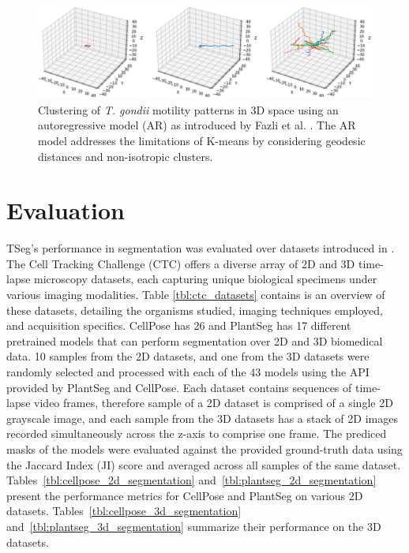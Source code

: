 \documentclass[./dissertation.tex]{subfiles}
\begin{document}
\begin{figure}[h]
    \centering\includegraphics[width=.9\textwidth]{figures/tseg/clusters plot.png}
    \caption{Clustering of \textit{\textit{T. gondii}} motility patterns in 3D space using an autoregressive model (AR) as introduced by Fazli et al. \cite{fazli2019lightweight}. The AR model addresses the limitations of K-means by considering geodesic distances and non-isotropic clusters.}
    \label{fig:clustering}
\end{figure}



\section{Evaluation}
TSeg's performance in segmentation was evaluated over datasets introduced in \cite{mavska2023cell}. The Cell Tracking Challenge (CTC) offers a diverse array of 2D and 3D time-lapse microscopy datasets, each capturing unique biological specimens under various imaging modalities. Table \ref{tbl:ctc_datasets} contains is an overview of these datasets, detailing the organisms studied, imaging techniques employed, and acquisition specifics. CellPose has 26 and PlantSeg has 17 different pretrained models that can perform segmentation over 2D and 3D biomedical data. 10 samples from the 2D datasets, and one from the 3D datasets were randomly selected and processed with each of the 43 models using the API provided by PlantSeg and CellPose. Each dataset contains sequences of time-lapse video frames, therefore sample of a 2D dataset is comprised of a single 2D grayscale image, and each sample from the 3D datasets has a stack of 2D images recorded simultaneously across the z-axis to comprise one frame. The prediced masks of the models were evaluated against the provided ground-truth data using the Jaccard Index (JI) score and averaged across all samples of the same dataset. Tables~\ref{tbl:cellpose_2d_segmentation} and~\ref{tbl:plantseg_2d_segmentation} present the performance metrics for CellPose and PlantSeg on various 2D datasets. Tables~\ref{tbl:cellpose_3d_segmentation} and~\ref{tbl:plantseg_3d_segmentation} summarize their performance on the 3D datasets.
\end{document}
